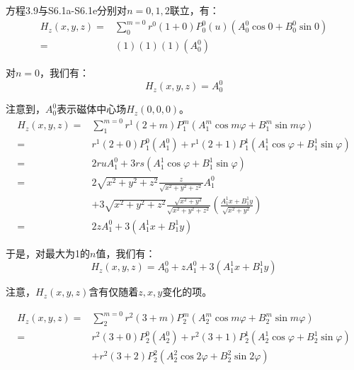 方程3.9与S6.1a-S6.1e分别对$n=0,1,2$联立，有：
\begin{equation}%
\begin{split}
H_z(x,y,z)=&\sum_{0}^{m=0}r^0(1+0)P_{0}^{0}(u)(A_{0}^{0}\cos0 +B_{0}^{0}\sin 0)\\
=&(1)(1)(1)(A_{0}^{0})
\end{split}
\end{equation}

对$n=0$，我们有：
 \begin{equation}%
H_z(x,y,z)=A_{0}^{0}
\end{equation}

注意到，$A_0^0$表示磁体中心场$H_z(0, 0, 0)$。
\begin{equation}%
\begin{split}
H_z(x,y,z)=&\sum_{1}^{m=0}r^1(2+m)P_{1}^{m}(A_{1}^{m}\cos m\varphi+B_{1}^{m}\sin m\varphi)\\
=&r^1(2+0)P_{1}^{0}(A_{1}^{0})+r^1(2+1)
P_{1}^{1}(A_{1}^{1}\cos\varphi+B_{1}^{1}\sin\varphi)\\
=&2ruA_{1}^{0}+3rs(A_{1}^{1}\cos\varphi+B_{1}^{1}\sin\varphi)\\
=&2\sqrt{x^2+y^2+z^2}\frac{z}{\sqrt{x^2+y^2+z^2}}A_{1}^{0}\\
&+3\sqrt{x^2+y^2+z^2}\frac{\sqrt{x^2+y^2}}{\sqrt{x^2+y^2+z^2}}\left(\frac{A_{1}^{1}x+B_{1}^{1}y}{\sqrt{x^2+y^2}}\right)\\
=&2zA_{1}^{0}+3(A_{1}^{1}x+B_{1}^{1}y)
\end{split}
\end{equation}

于是，对最大为1的$n$值，我们有：
\begin{equation}%
H_z(x,y,z)=A_{0}^{0}+zA_{1}^{0}+3(A_{1}^{1}x+B_{1}^{1}y)
\end{equation}

注意，$H_z(x, y, z)$含有仅随着$z,x,y$变化的项。

 \begin{equation}%
 \begin{split}
H_z(x,y,z)=&\sum_{2}^{m=0}r^2(3+m)P_{2}^{m}(A_{2}^{m}\cos m\varphi+B_{2}^{m}\sin m\varphi)\\
=&r^2(3+0)P_{2}^{0}(A_{2}^{0})+r^2(3+1)P_{2}^{1}
(A_{2}^{1}\cos\varphi+B_{2}^{1}\sin\varphi)\\
&+r^2(3+2)P_{2}^{2}(A_{2}^{2}\cos 2\varphi+B_{2}^{2}\sin 2\varphi)
 \end{split}
\end{equation}

